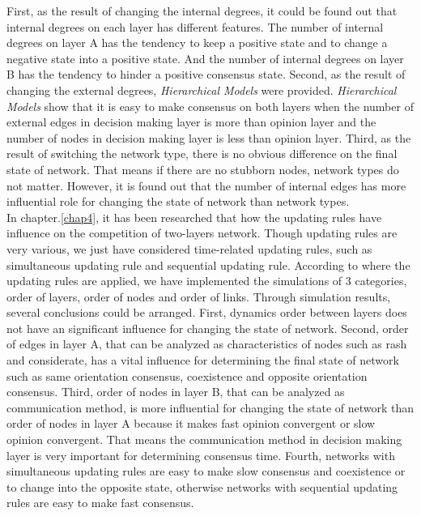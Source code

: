 First, as the result of changing the internal degrees, it could be found out that internal degrees on each layer has different features. The number of internal degrees on layer A has the tendency to keep a positive state and to change a negative state into a positive state. And the number of internal degrees on layer B has the tendency to hinder a positive consensus state. Second, as the result of changing the external degrees, \textit{Hierarchical Models} were provided. \textit{Hierarchical Models} show that it is easy to make consensus on both layers when the number of external edges in decision making layer is more than opinion layer and the number of nodes in decision making layer is less than opinion layer. Third, as the result of switching the network type, there is no obvious difference on the final state of network. That means if there are no stubborn nodes, network types do not matter. However, it is found out that the number of internal edges has more influential role for changing the state of network than network types.\\

In chapter.\ref{chap4}, it has been researched that how the updating rules have influence on the competition of two-layers network. Though updating rules are very various, we just have considered time-related updating rules, such as simultaneous updating rule and sequential updating rule. According to where the updating rules are applied, we have implemented the simulations of 3 categories, order of layers, order of nodes and order of links. Through simulation results, several conclusions could be arranged. First, dynamics order between layers does not have an significant influence for changing the state of network. Second, order of edges in layer A, that can be analyzed as characteristics of nodes such as rash and considerate, has a vital influence for determining the final state of network such as same orientation consensus, coexistence and opposite orientation consensus. Third, order of nodes in layer B, that can be analyzed as communication method, is more influential for changing the state of network than order of nodes in layer A because it makes fast opinion convergent or slow opinion convergent. That means the communication method in decision making layer is very important for determining consensus time. Fourth, networks with simultaneous updating rules are easy to make slow consensus and coexistence or to change into the opposite state, otherwise networks with sequential updating rules are easy to make fast consensus.\\

